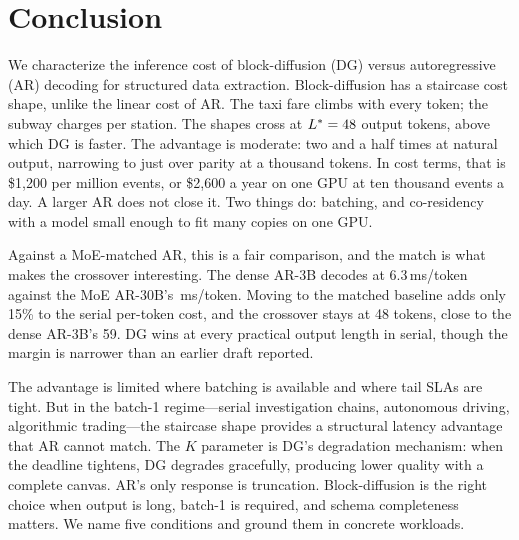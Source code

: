 \section{Conclusion}
\label{sec:conclusion}

We characterize the inference cost of block-diffusion (DG) versus
autoregressive (AR) decoding for structured data extraction.
Block-diffusion has a staircase cost shape, unlike the linear cost of
AR. The taxi fare climbs with every token; the subway charges per
station. The shapes cross at $L^{*} = 48$ output tokens, above
which DG is faster. The advantage is moderate: two and a half times at
natural output, narrowing to just over parity at a thousand tokens. In
cost terms, that is \$1{,}200 per million events, or \$2{,}600 a year on
one GPU at ten thousand events a day. A larger AR does not close it.
Two things do: batching, and co-residency with a model small enough to
fit many copies on one GPU.

Against a MoE-matched AR, this is a fair comparison, and the match is
what makes the crossover interesting. The dense AR-3B decodes at
6.3\,ms/token against the MoE AR-30B's \arSlope\,ms/token. Moving to
the matched baseline adds only 15\% to the serial per-token cost, and
the crossover stays at 48 tokens, close to the dense AR-3B's 59. DG
wins at every practical output length in serial, though the margin is
narrower than an earlier draft reported.

The advantage is limited where batching is available and where tail
SLAs are tight. But in the batch-1 regime---serial investigation
chains, autonomous driving, algorithmic trading---the staircase shape
provides a structural latency advantage that AR cannot match. The $K$
parameter is DG's degradation mechanism: when the deadline tightens, DG
degrades gracefully, producing lower quality with a complete canvas.
AR's only response is truncation. Block-diffusion is the right choice
when output is long, batch-1 is required, and schema completeness
matters. We name five conditions and ground them in concrete workloads.
